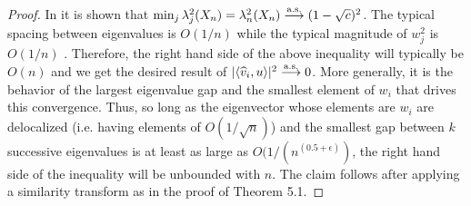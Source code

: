 \begin{proof}
In \cite{silverstein1985smallest} it is shown that $\min_j\lambda_j^2(X_n)=\lambda_n^2(X_n)
\overset{\textrm{a.s.}}{\longrightarrow} (1-\sqrt{c})^2$. The typical spacing between eigenvalues is $O(1/n)$ while the
typical magnitude of $w_j^2$ is $O(1/n)$ \cite{barvinok2005measure}. Therefore, the right hand side of the above inequality will typically be $O(n)$ and we get the desired
result of $|\langle \widehat{v}_i,u\rangle |^2\overset{\textrm{a.s.}}{\longrightarrow} 0$. More generally, it is the
behavior of the largest eigenvalue gap and the smallest element of $w_i$ that drives this
convergence. Thus, so long as the eigenvector whose elements are $w_i$ are delocalized
(i.e. having elements of $O(1/\sqrt{n})$) and the smallest gap between $k$ successive
eigenvalues is at least as large as $O(1/(n^{(0.5+ \epsilon)})$, the right hand side of the inequality will be unbounded with $n$. The claim follows after applying a similarity transform as in the
proof of Theorem 5.1.


\end{proof}
